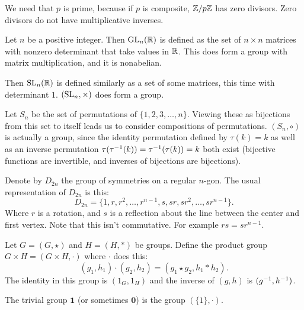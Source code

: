 \documentclass[11pt]{scrreport}
\begin{document}
\begin{remark}
    We need that $p$ is prime, because if $p$ is composite, $\mathbb Z/p\mathbb Z$ has zero divisors. Zero divisors do not have multiplicative inverses.
\end{remark}
\begin{example}
    Let $n$ be a positive integer. Then $\operatorname{GL}_n(\mathbb R)$ is defined as the set of $n\times n$ matrices with nonzero determinant that take values in $\mathbb R$. This does form a group with matrix multiplication, and it is nonabelian.
\end{example}
\begin{example}
    Then $\operatorname{SL}_n(\mathbb R)$ is defined similarly as a set of some matrices, this time with determinant $1$. $(\operatorname{SL}_n,\times)$ does form a group.
\end{example}
\begin{example}
    Let $S_n$ be the set of permutations of $\{1,2,3,\dots,n\}$.
    Viewing these as bijections from this set to itself leads us to consider compositions of permutations. $(S_n,\circ)$ is actually a group, 
    since the identity permutation defined by $\tau(k)=k$ as well as an inverse permutation $\tau(\tau^{-1}(k))=\tau^{-1}(\tau(k))=k$ both exist (bijective functions are invertible, and inverses of bijections are bijections).
\end{example}
\begin{example}
    Denote by $D_{2n}$ the group of symmetries on a regular $n$-gon. The usual representation of $D_{2n}$ is this:
    \[D_{2n}=\{1,r,r^2,\dots,r^{n-1},s,sr,sr^2,\dots,sr^{n-1}\}.\]
    Where $r$ is a rotation, and $s$ is a reflection about the line between the center and first vertex.
    Note that this isn't commutative. For example $rs=sr^{n-1}$.
\end{example}
\begin{example}
    Let $G=(G,\star)$ and $H=(H,\ast)$ be groups. Define the product group $G\times H = (G\times H, \cdot)$ where $\cdot$ does this:
    \[(g_1,h_1)\cdot(g_2,h_2)=(g_1\star g_2, h_1\ast h_2).\]
    The identity in this group is $(1_G,1_H)$ and the inverse of $(g,h)$ is $(g^{-1}, h^{-1})$.
\end{example}
\begin{example}
    The trivial group $\mathbf1$ (or sometimes $\mathbf{0}$) is the group $(\{1\},\cdot)$.
\end{example}
\end{document}

